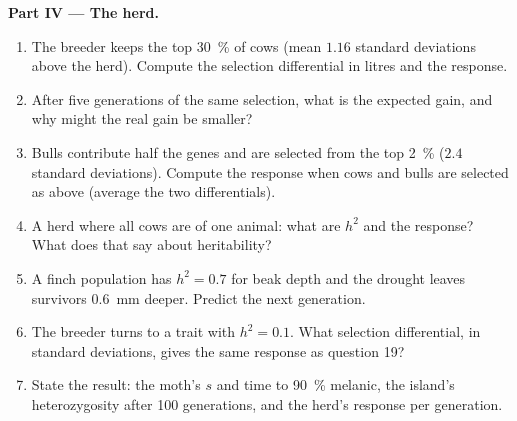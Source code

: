 \begin{problem}
\medskip
\noindent\textbf{Part IV --- The herd.}
\begin{enumerate}[resume]
  \item The breeder keeps the top \qty{30}{\%} of cows (mean $1.16$
        standard deviations above the herd). Compute the selection
        differential in litres and the response.
  \item After five generations of the same selection, what is the
        expected gain, and why might the real gain be smaller?
  \item Bulls contribute half the genes and are selected from the top
        \qty{2}{\%} ($2.4$ standard deviations). Compute the response
        when cows and bulls are selected as above (average the two
        differentials).
  \item A herd where all cows are  of one animal: what are
        $h^{2}$ and the response? What does that say about
        heritability?
  \item A finch population has $h^{2} = 0.7$ for beak depth and the
        drought leaves survivors \qty{0.6}{mm} deeper. Predict the
        next generation.
  \item The breeder turns to a trait with $h^{2} = 0.1$. What
        selection differential, in standard deviations, gives the
        same response as question 19?
  \item State the result: the moth's $s$ and time to \qty{90}{\%}
        melanic, the island's heterozygosity after 100 generations,
        and the herd's response per generation.
\end{enumerate}
\end{problem}
